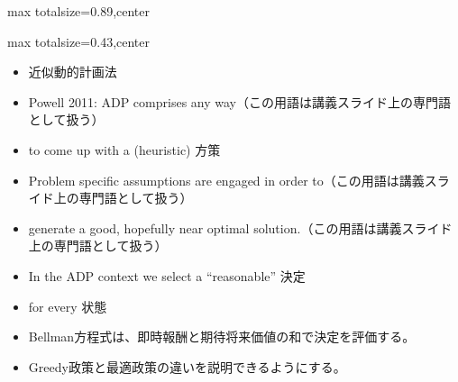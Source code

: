 \begin{minipage}[t]{0.58\textwidth}
\begin{adjustbox}{max totalsize={\textwidth}{0.89\textheight},center}
\begin{minipage}{\textwidth}
\end{minipage}
\end{adjustbox}
\end{minipage}


\clearpage
{}
\begin{minipage}[t]{0.405\textwidth}
\begin{adjustbox}{max totalsize={\textwidth}{0.43\textheight},center}
\begin{minipage}{\textwidth}\scriptsize
{}\begin{itemize}
\item 近似動的計画法
\item Powell 2011: ADP comprises any way（この用語は講義スライド上の専門語として扱う）
\item to come up with a (heuristic) 方策
\item Problem specific assumptions are engaged in order to（この用語は講義スライド上の専門語として扱う）
\item generate a good, hopefully near optimal solution.（この用語は講義スライド上の専門語として扱う）
\item In the ADP context we select a “reasonable” 決定
\item for every 状態
\end{itemize}\begin{itemize}
\item Bellman方程式は、即時報酬と期待将来価値の和で決定を評価する。
\item Greedy政策と最適政策の違いを説明できるようにする。
\end{itemize}
\end{minipage}
\end{adjustbox}
\end{minipage}\hfill
